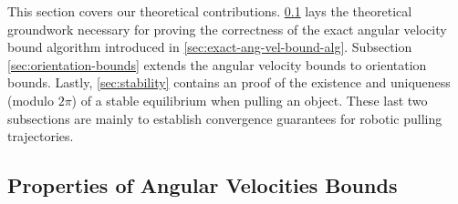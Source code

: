 \documentclass[conference]{IEEEtran}
\newtheorem{proposition}{Proposition}
\newcommand{\EH}[1]{{\color{blue} {Eric: {#1}}  }}
\begin{document}
This section covers our theoretical
contributions. \ref{sec:prop-angular-velocity-bounds} lays the
theoretical groundwork necessary for proving the correctness of the
exact angular velocity bound algorithm introduced in
\ref{sec:exact-ang-vel-bound-alg}. Subsection
\ref{sec:orientation-bounds} extends the angular velocity bounds to
orientation bounds. Lastly, \ref{sec:stability} contains an proof of
the existence and uniqueness (modulo $2\pi$) of a stable equilibrium
when pulling an object. These last two subsections are mainly to
establish convergence guarantees for robotic pulling trajectories.

\subsection{Properties of Angular Velocities Bounds}\label{sec:prop-angular-velocity-bounds}



\end{document}
